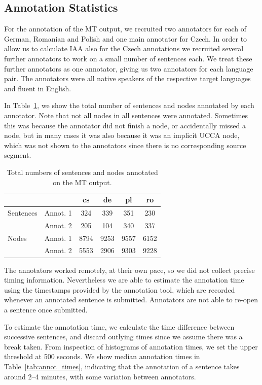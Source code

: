 \documentclass[11pt]{article}
\newcommand{\tabref}[1]{Table~\ref{#1}}
\begin{document}
\subsection{Annotation Statistics}
\label{sec:annot_stats}

For the annotation of the MT output, we recruited two annotators for each of German, Romanian
and Polish and one main annotator for Czech. In order to allow us to calculate IAA also for
the Czech annotations we recruited several further annotators to work on a small number of 
sentences each. We treat these further annotators as one annotator, giving us two annotators
for each language pair.
The annotators were all native  speakers of the respective target languages and fluent in English.

In \tabref{tab:annot},
we show the total number of sentences and nodes annotated by each annotator. Note that not all nodes in all sentences were annotated. Sometimes this was because the
annotator did not finish a node, or accidentally missed a node, but in many cases it was also because it was an implicit 
UCCA node, which was not shown to the annotators since there is no corresponding source segment.
\begin{table}
\begin{center}
{\small
\begin{tabular}{ll|cccc}
& & cs & de & pl & ro \\
\hline
Sentences &  Annot. 1 & 324   & 339  & 351  & 230  \\
 & Annot. 2 & 205 & 104  & 340  & 337 \\
\hline
Nodes & Annot. 1 & 8794  & 9253 & 9557  & 6152 \\
 &Annot. 2 & 5553 & 2906  & 9303  & 9228  \\
\end{tabular}
}
\caption{Total numbers of sentences and nodes annotated on the MT output.}
\label{tab:annot}
\end{center}
\end{table}

The annotators worked remotely, at their own pace, so we did not collect precise timing
information. Nevertheless we are able to estimate the annotation time using the timestamps
provided by the annotation tool, which are recorded whenever an annotated sentence is
submitted. Annotators are not able to re-open a sentence once submitted. 

To estimate the annotation time, we calculate the time difference between successive 
sentences, and discard outlying times since we assume there was a break taken. From inspection
of histograms of annotation times, we set the upper threshold at 500 seconds. We
show median annotation times in Table~\ref{tab:annot_times}, indicating that the annotation
of a sentence takes around 2--4 minutes, with some variation between annotators.
\end{document}
